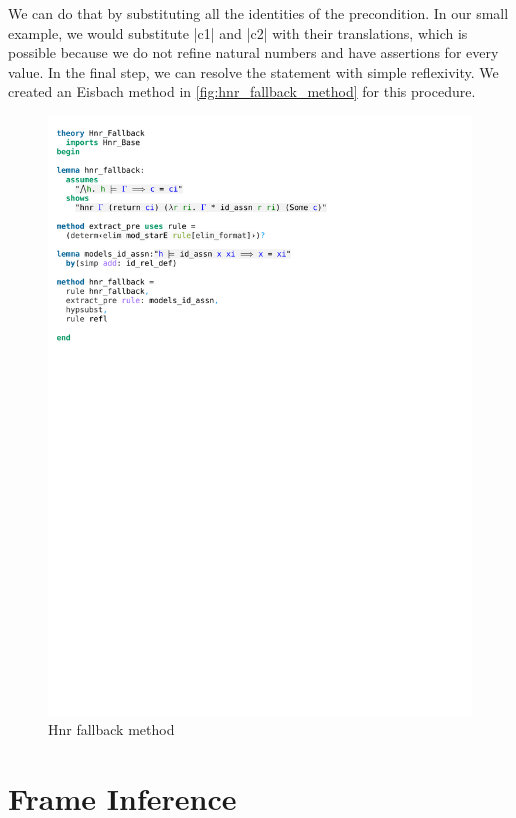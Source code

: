 \noindent We can do that by substituting all the identities of the precondition. In our small example, we would substitute |c1| and |c2| with their translations, which is possible because we do not refine natural numbers and have assertions for every value.
In the final step, we can resolve the statement with simple reflexivity. We created an Eisbach method in \autoref{fig:hnr_fallback_method} for this procedure.

\begin{figure}[htpb]
    \includegraphics[trim={0 19,4cm 0 5,2cm}, clip, width=1.00\textwidth]{figures/Theory_Hnr_Fallback.pdf}
    \caption[Hnr fallback method]{Hnr fallback method}
    \label{fig:hnr_fallback_method}
\end{figure}

\section{Frame Inference}

